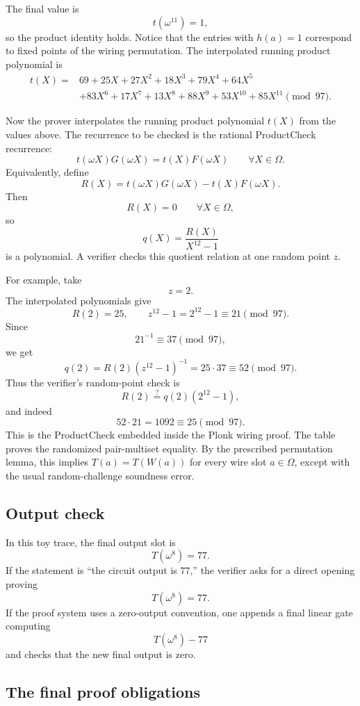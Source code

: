 \documentclass[11pt]{article}
\begin{document}
The final value is
\[
    t(\omega^{11})=1,
\]
so the product identity holds. Notice that the entries with $h(a)=1$ correspond to fixed points of the wiring permutation. The interpolated running product polynomial is
\[
\begin{aligned}
t(X)={}&69+25X+27X^2+18X^3+79X^4+64X^5\\
&+83X^6+17X^7+13X^8+88X^9+53X^{10}+85X^{11}
\pmod{97}.
\end{aligned}
\]

Now the prover interpolates the running product polynomial $t(X)$ from the values above. The recurrence to be checked is the rational ProductCheck recurrence:
\[
    t(\omega X)G(\omega X)=t(X)F(\omega X)
    \qquad\forall X\in\Omega.
\]
Equivalently, define
\[
    R(X)=t(\omega X)G(\omega X)-t(X)F(\omega X).
\]
Then
\[
    R(X)=0\qquad\forall X\in\Omega,
\]
so
\[
    q(X)=\frac{R(X)}{X^{12}-1}
\]
is a polynomial. A verifier checks this quotient relation at one random point $z$.

For example, take
\[
    z=2.
\]
The interpolated polynomials give
\[
    R(2)=25,
    \qquad
    z^{12}-1=2^{12}-1\equiv21\pmod{97}.
\]
Since
\[
    21^{-1}\equiv 37\pmod{97},
\]
we get
\[
    q(2)=R(2)(z^{12}-1)^{-1}=25\cdot37\equiv52\pmod{97}.
\]
Thus the verifier's random-point check is
\[
    R(2)
    \stackrel{?}{=}
    q(2)(2^{12}-1),
\]
and indeed
\[
    52\cdot21=1092\equiv25\pmod{97}.
\]
This is the ProductCheck embedded inside the Plonk wiring proof. The table proves the randomized pair-multiset equality. By the prescribed permutation lemma, this implies $T(a)=T(W(a))$ for every wire slot $a\in\Omega$, except with the usual random-challenge soundness error.

\subsection{Output check}

In this toy trace, the final output slot is
\[
    T(\omega^8)=77.
\]
If the statement is ``the circuit output is $77$,'' the verifier asks for a direct opening proving
\[
    T(\omega^8)=77.
\]
If the proof system uses a zero-output convention, one appends a final linear gate computing
\[
    T(\omega^8)-77
\]
and checks that the new final output is zero.

\subsection{The final proof obligations}
\end{document}
